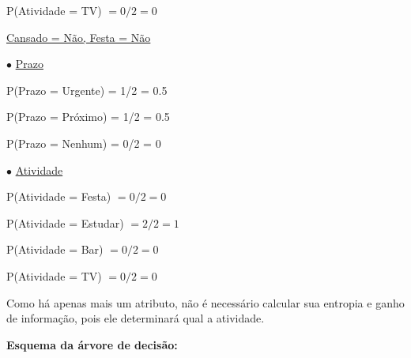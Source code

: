 \documentclass{article}
\begin{document}
\quad \qquad P(Atividade = TV) $= 0/2 = 0$

\bigskip
\quad \underline{Cansado = Não, Festa = Não}

\qquad $\bullet$ \underline{Prazo}

\quad \qquad P(Prazo = Urgente) = 1/2 = 0.5

\quad \qquad P(Prazo = Próximo) = 1/2 = 0.5

\quad \qquad P(Prazo = Nenhum) = 0/2 = 0

\bigskip
\qquad $\bullet$ \underline{Atividade}

\quad \qquad P(Atividade = Festa) $= 0/2 = 0$

\quad \qquad P(Atividade = Estudar) $= 2/2 = 1$

\quad \qquad P(Atividade = Bar) $= 0/2 = 0$

\quad \qquad P(Atividade = TV) $= 0/2 = 0$

\bigskip
\quad Como há apenas mais um atributo, não é necessário calcular sua entropia e ganho de informação, pois ele determinará qual a atividade.

\bigskip
\quad \textbf{Esquema da árvore de decisão:}
\end{document}
